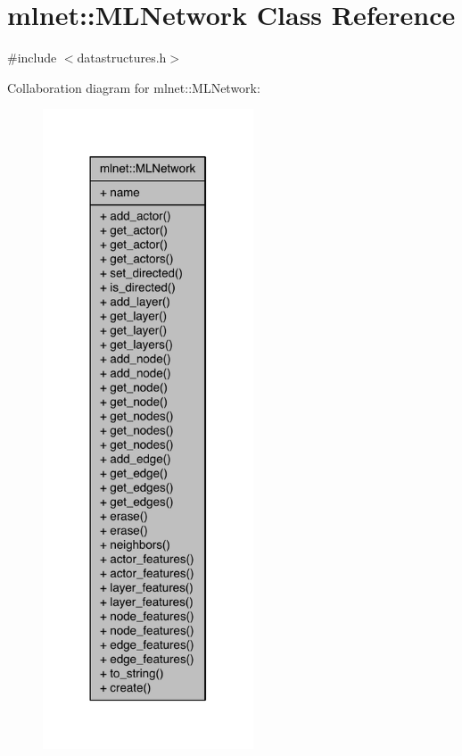 \hypertarget{classmlnet_1_1_m_l_network}{\section{mlnet\+:\+:M\+L\+Network Class Reference}
\label{classmlnet_1_1_m_l_network}
}


{\ttfamily \#include $<$datastructures.\+h$>$}



Collaboration diagram for mlnet\+:\+:M\+L\+Network\+:\nopagebreak
\begin{figure}[H]
\begin{center}
\leavevmode
\includegraphics[width=177pt]{classmlnet_1_1_m_l_network__coll__graph}
\end{center}
\end{figure}
